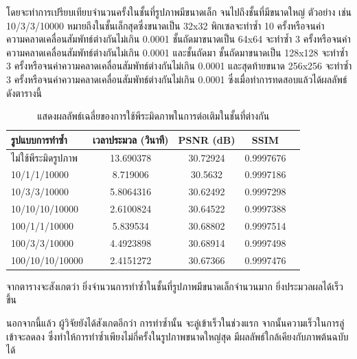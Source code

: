 \documentclass[hidelinks, a4paper,12pt]{article}
\numberwithin{equation}{section}							%
\numberwithin{equation}{section}
\begin{document}
{	\hspace{1cm} โดยจะทำการเปรียบเทียบจำนวนครั้งในชั้นที่รูปภาพมีขนาดเล็ก จนไปถึงชั้นที่มีขนาดใหญ่ ตัวอย่าง เช่น 10/3/3/10000 หมายถึงในชั้นเล็กสุดซึ่งขนาดเป็น 32x32 พิกเซลจะทำซ้ำ 10 ครั้งหรือจนค่าความคลาดเคลื่อนสัมพัทธ์ต่างกันไม่เกิน 0.0001  ชั้นถัดมาขนาดเป็น 64x64 จะทำซ้ำ 3 ครั้งหรือจนค่าความคลาดเคลื่อนสัมพัทธ์ต่างกันไม่เกิน 0.0001 และชั้นถัดมา ชั้นถัดมาขนาดเป็น 128x128 จะทำซ้ำ 3 ครั้งหรือจนค่าความคลาดเคลื่อนสัมพัทธ์ต่างกันไม่เกิน 0.0001 และสุดท้ายขนาด 256x256 จะทำซ้ำ 3 ครั้งหรือจนค่าความคลาดเคลื่อนสัมพัทธ์ต่างกันไม่เกิน 0.0001 ซึ่งเมื่อทำการทดสอบแล้วได้ผลลัพธ์ดังตารางนี้
	
		\begin{table}[H]
		\centering
		\begin{tabular}[ht]{|l|c|c|c|c|}
			\hline
			รูปแบบการทำซ้ำ  & เวลาประมวล  (วินาที) & PSNR (dB) & SSIM \\
			\hline
			ไม่ใช้พีระมิดรูปภาพ & 13.690378 & 30.72924 & 0.9997676 \\
			10/1/1/10000 & 8.719006 & 30.5632 & 0.9997186 \\
			10/3/3/10000 & 5.8064316 & 30.62492 & 0.9997298 \\
			10/10/10/10000 & 2.6100824 & 30.64522 & 0.9997388 \\
			100/1/1/10000 & 5.839534 & 30.68802 & 0.9997514 \\
			100/3/3/10000 & 4.4923898 & 30.68914 & 0.9997498 \\
			100/10/10/10000 & 2.4151272 & 30.67366 & 0.9997476 \\
			\hline
		\end{tabular}
		\caption{แสดงผลลัพธ์เฉลี่ยของการใช้พีระมิดภาพในการต่อเติมในชั้นที่ต่างกัน}
	\end{table}	
	
	จากตารางจะสังเกตว่า ยิ่งจำนวนการทำซ้ำในชั้นที่รูปภาพมีขนาดเล็กจำนวนมาก ยิ่งประมวลผลได้เร็วขึ้น 
	
	นอกจากนี้แล้ว ผู้วิจัยยังได้สังเกตอีกว่า การทำซ้ำนั้น จะลู่เข้าเร็วในช่วงแรก จากนั้นความเร็วในการลู่เข้าจะลดลง ซึ่งทำให้การทำซ้ำเพียงไม่กี่ครั้งในรูปภาพขนาดใหญ่สุด มีผลลัพธ์ใกล้เคียงกับภาพต้นฉบับได้
	
}
\end{document}
